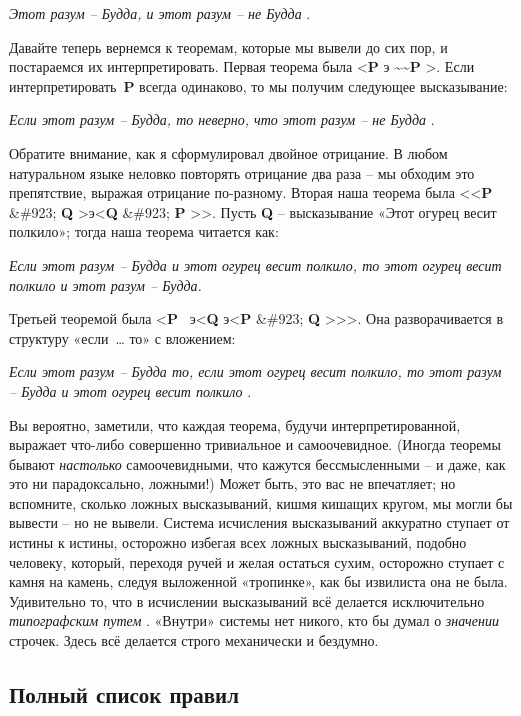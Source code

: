 \documentclass[../main.tex]{subfiles}
\begin{document}
\emph{Этот разум \--- Будда, и этот разум \--- не Будда} .

Давайте теперь вернемся к теоремам, которые мы вывели до сих пор, и постараемся их интерпретировать. Первая теорема была \textless{}\textbf{P} э \textbf{\textasciitilde\textasciitilde P} \textgreater. Если интерпретировать~\textbf{P} всегда одинаково, то мы получим следующее высказывание:

\emph{Если этот разум \--- Будда, то неверно, что этот разум \--- не Будда} .

Обратите внимание, как я сформулировал двойное отрицание. В любом натуральном языке неловко повторять отрицание два раза \--- мы обходим это препятствие, выражая отрицание по-разному. Вторая наша теорема была \textless\textless{}\textbf{P} \&\#923; \textbf{Q} \textgreater э\textless{}\textbf{Q} \&\#923; \textbf{P} \textgreater\textgreater. Пусть \textbf{Q} \--- высказывание «Этот огурец весит полкило»; тогда наша теорема читается как:

\emph{Если этот разум \--- Будда и этот огурец весит полкило, то этот огурец весит полкило и этот разум \--- Будда.}

Третьей теоремой была \textless{}\textbf{P} ~э\textless{}\textbf{Q} э\textless{}\textbf{P} \&\#923; \textbf{Q} \textgreater\textgreater\textgreater. Она разворачивается в структуру «если~\ldots{} то» с вложением:

\emph{Если этот разум \--- Будда то, если этот огурец весит полкило, то этот разум \--- Будда и этот огурец весит полкило} .

Вы вероятно, заметили, что каждая теорема, будучи интерпретированной, выражает что-либо совершенно тривиальное и самоочевидное. (Иногда теоремы бывают \emph{настолько} самоочевидными, что кажутся бессмысленными \--- и даже, как это ни парадоксально, ложными!) Может быть, это вас не впечатляет; но вспомните, сколько ложных высказываний, кишмя кишащих кругом, мы могли бы вывести \--- но не вывели. Система исчисления высказываний аккуратно ступает от истины к истины, осторожно избегая всех ложных высказываний, подобно человеку, который, переходя ручей и желая остаться сухим, осторожно ступает с камня на камень, следуя выложенной «тропинке», как бы извилиста она не была. Удивительно то, что в исчислении высказываний всё делается исключительно \emph{типографским путем} . «Внутри» системы нет никого, кто бы думал о \emph{значении} строчек. Здесь всё делается строго механически и бездумно.


\subsection{Полный список правил}
\end{document}
